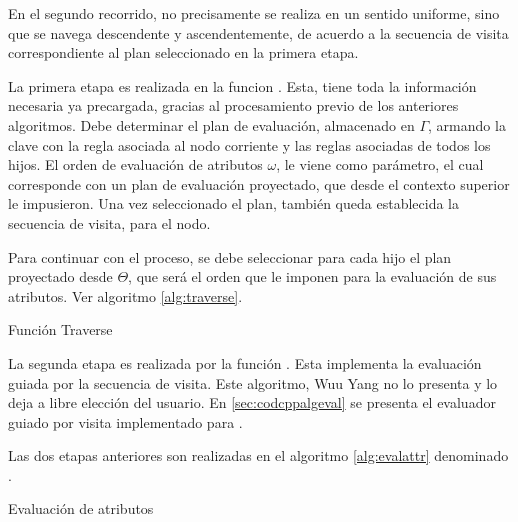 En el segundo recorrido, no precisamente se realiza en un sentido uniforme, sino que se navega descendente y ascendentemente, de acuerdo a la secuencia de visita correspondiente al plan seleccionado en la primera etapa. 

La primera etapa es realizada en la funcion . Esta, tiene toda la información necesaria ya precargada, gracias al procesamiento previo de los anteriores algoritmos. Debe determinar el plan de evaluación, almacenado en $\Gamma$, armando la clave con la regla asociada al nodo corriente y las reglas asociadas de todos los hijos. El orden de evaluación de atributos $\omega$, le viene como parámetro, el cual corresponde con un plan de evaluación proyectado, que desde el contexto superior le impusieron. Una vez seleccionado el plan, también queda establecida la secuencia de visita, para el nodo.

Para continuar con el proceso, se debe seleccionar para cada hijo el plan proyectado desde $\Theta$, que será el orden que le imponen para la evaluación de sus atributos. Ver algoritmo \ref{alg:traverse}.

\begin{algorithm}[!ht]

\caption{\label{alg:traverse} Función Traverse}
\end{algorithm}

La segunda etapa es realizada por la función . Esta implementa la evaluación guiada por la secuencia de visita. Este algoritmo, Wuu Yang no lo presenta y lo deja a libre elección del usuario. En \ref{sec:codcppalgeval} se presenta el evaluador guiado por visita implementado para \maggen. 


Las dos etapas anteriores son realizadas en el algoritmo \ref{alg:evalattr} denominado . 

\begin{algorithm}[!ht]

\caption{\label{alg:evalattr} Evaluación de atributos}
\end{algorithm}